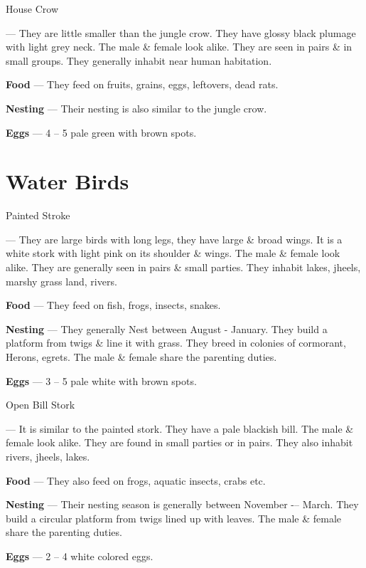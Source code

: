 \begin{bird}{House Crow}

 --- They are little smaller than the jungle crow. They have glossy black plumage with light grey neck. The male \& female look alike. They are seen in pairs \& in small groups. They generally inhabit near human habitation.

{\large\bf Food} --- They feed on fruits, grains, eggs, leftovers, dead rats.

{\large\bf Nesting} --- Their nesting is also similar to the jungle crow.

{\large\bf Eggs} --- 4 -- 5 pale green with brown spots.
\end{bird}

\part{Water Birds}

\begin{bird}{Painted Stroke}

 --- They are large birds with long legs, they have large \& broad wings. It is a white stork with light pink on its shoulder \& wings. The male \& female look alike. They are generally seen in pairs \& small parties. They inhabit lakes, jheels, marshy grass land, rivers.

{\large\bf Food} --- They feed on fish, frogs, insects, snakes.

{\large\bf Nesting} --- They generally Nest between August - January. They build a platform from twigs \& line it with grass. They breed in colonies of cormorant, Herons, egrets. The male \& female share the parenting duties.

{\large\bf Eggs} --- 3 -- 5 pale white with brown spots.
\end{bird}

\begin{bird}{Open Bill Stork}

 --- It is similar to the painted stork. They have a pale blackish bill. The male \& female look alike. They are found in small parties or in pairs. They also inhabit rivers, jheels, lakes.

{\large\bf Food} --- They also feed on frogs, aquatic insects, crabs etc.

{\large\bf Nesting} --- Their nesting season is generally between November -– March. They build a circular platform from twigs lined up with leaves. The male \& female share the parenting duties. 

{\large\bf Eggs} --- 2 -- 4 white colored eggs.
\end{bird}

